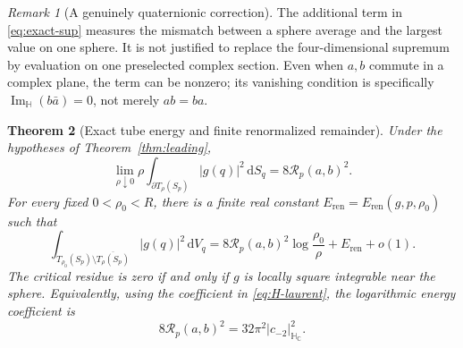 \documentclass[11pt,a4paper]{article}
\numberwithin{equation}{section}
\newtheorem{theorem}{Theorem}[section]
\theoremstyle{definition}
\theoremstyle{remark}
\newtheorem{remark}[theorem]{Remark}
\newcommand{\C}{\mathbb C}
\newcommand{\HH}{\mathbb H}
\newcommand{\HC}{\mathbb H_{\C}}
\newcommand{\ImH}{\operatorname{Im}_{\HH}}
\newcommand{\dd}{\,\mathrm d}
\begin{document}
\begin{remark}[A genuinely quaternionic correction]
The additional term in \eqref{eq:exact-sup} measures the mismatch between
a sphere average and the largest value on one sphere. It is not justified
to replace the four-dimensional supremum by evaluation on one preselected
complex section. Even when $a,b$ commute in a complex plane, the term can
be nonzero; its vanishing condition is specifically
$\ImH(b\bar a)=0$, not merely $ab=ba$.
\end{remark}

\begin{theorem}[Exact tube energy and finite renormalized remainder]
\label{thm:energy}
Under the hypotheses of Theorem~\ref{thm:leading},
\begin{equation}
 \lim_{\rho\downarrow0}
       \rho\int_{\partial T_\rho(S_p)}|g(q)|^2\dd S_q
       =8\mathcal R_p(a,b)^2.\label{eq:energy-trace}
\end{equation}
For every fixed $0<\rho_0<R$, there is a finite real constant
$E_{\mathrm{ren}}=E_{\mathrm{ren}}(g,p,\rho_0)$ such that
\begin{equation}
 \int_{T_{\rho_0}(S_p)\setminus\overline{T_\rho(S_p)}}|g(q)|^2\dd V_q
 =8\mathcal R_p(a,b)^2\log\frac{\rho_0}{\rho}
       +E_{\mathrm{ren}}+o(1).\label{eq:energy-law}
\end{equation}
The critical residue is zero if and only if $g$ is locally square
integrable near the sphere. Equivalently, using the coefficient in
\eqref{eq:H-laurent}, the logarithmic energy coefficient is
\begin{equation}
 8\mathcal R_p(a,b)^2=32\pi^2|c_{-2}|_{\HC}^2.
 \label{eq:energy-Laurent}
\end{equation}
\end{theorem}
\end{document}
